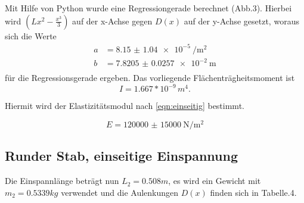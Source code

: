 Mit Hilfe von Python wurde eine Regressiongerade berechnet (Abb.3).
Hierbei wird $(Lx^2- \frac{x^3}{3})$ auf der x-Achse gegen $D(x)$ auf der y-Achse
gesetzt, woraus sich die Werte
\begin{align*}
  a &= \SI{8.15(104)e-5}{\per\square\meter} \\
  b &= \SI{7.8205(257)e-2}{\meter} \\
\end{align*}
für die Regressionsgerade ergeben.
\newline
Das vorliegende Flächenträgheitsmoment ist
\begin{equation*}
  I = 1.667* 10^{-9}\, m^4.
\end{equation*}

Hiermit wird der Elastizitätsmodul nach \ref{eqn:einseitig} bestimmt.

\begin{equation*}
  E = \SI{120000(15000)}{\newton\per\square\meter}
\end{equation*}
\newpage






\subsection{Runder Stab, einseitige Einspannung}
Die Einspannlänge beträgt nun $L_2 = 0.508m$, es wird ein Gewicht
mit $m_2 = 0.5339 kg $ verwendet und die Aulenkungen $D(x)$ finden
sich in Tabelle.4.

